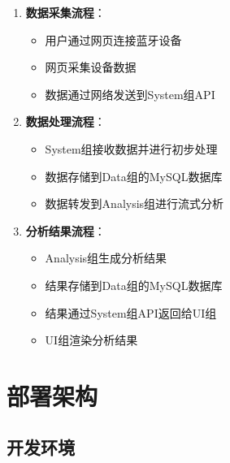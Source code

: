 \documentclass[a4paper,12pt]{article}
\begin{document}
\begin{enumerate}
  \item \textbf{数据采集流程}：
    \begin{itemize}
      \item 用户通过网页连接蓝牙设备
      \item 网页采集设备数据
      \item 数据通过网络发送到System组API
    \end{itemize}
  
  \item \textbf{数据处理流程}：
    \begin{itemize}
      \item System组接收数据并进行初步处理
      \item 数据存储到Data组的MySQL数据库
      \item 数据转发到Analysis组进行流式分析
    \end{itemize}
  
  \item \textbf{分析结果流程}：
    \begin{itemize}
      \item Analysis组生成分析结果
      \item 结果存储到Data组的MySQL数据库
      \item 结果通过System组API返回给UI组
      \item UI组渲染分析结果
    \end{itemize}
\end{enumerate}

\section{部署架构}

\subsection{开发环境}
\end{document}
